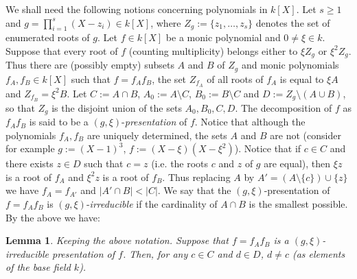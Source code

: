 \documentclass[a4paper, 11pt]{article}
\newtheorem{lemma}[theorem]{Lemma}
\theoremstyle{definition}
\begin{document}
\medskip


We shall need the following notions concerning polynomials in $k[X]$.  Let $s\geq 1$ and  $ g=\prod_{i=1}^{s}(X-z_i) \in k[X] $,  where $Z_g:=\{z_1,\ldots, z_s\}$ denotes the set of enumerated roots of $g$. Let $f\in k[X]$ be a monic polynomial and $0\ne \xi\in k$. Suppose that every root of $f$ (counting multiplicity) belongs either to $\xi Z_g$ or $\xi^2Z_g$. Thus there  are (possibly empty) subsets $A$ and $B$ of $Z_g$   and  monic polynomials  $f_A, f_B\in k[X]$ such that $f=f_Af_B$, the set $Z_{f_A}$ of all roots  of  $f_A$ is equal to $\xi A$ and $Z_{f_B}=\xi^2B$. Let $C:=A\cap B$, $A_0:=A\setminus C$,  $B_0:=B\setminus C$ and $D:=Z_g\setminus (A\cup B)$, so that  $Z_g $ is the disjoint union of the sets $A_0,B_0,C,  D$.  The decomposition of $f$ as $f_Af_B$ is said to be a $(g,\xi)$-{\it presentation} of $f$. Notice that although the polynomials $f_A,f_B$ are uniquely determined, the sets $A $ and $B$ are not (consider for example $g:=(X-1)^3$, $f:=(X-\xi)(X-\xi^2)$). Notice that if  $c\in C$ and there exists $z\in D$ such that $c=z$ (i.e. the roots $c$ and $z$  of $g$ are equal), then $\xi z$ is a root of $f_A$ and $\xi^2z$ is a root of $f_B$. Thus replacing $A$ by $A'=( A\setminus  \{c\})\cup \{z\}$ we have $f_A=f_{A'}$ and $|A'\cap B|< |C|$.  We say that the $(g,\xi)$-presentation of $f=f_Af_B$ is $(g,\xi)$-{\it irreducible} if  the cardinality of $A\cap B$ is the smallest possible.  By the above we have:

 \begin{lemma}\label{irrepresentation} Keeping the above notation. Suppose that $f=f_Af_B$ is a $(g,\xi)$-irreducible  presentation of $f$. Then, for any $c\in C$ and $d\in D$, $d\ne c$ (as elements of the base field $k$).
 \end{lemma}
\end{document}
